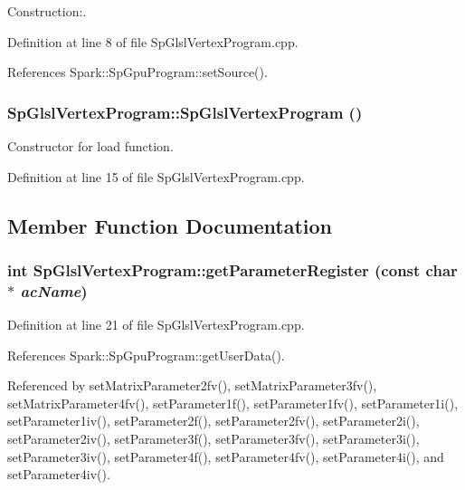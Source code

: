 Construction:. 

Definition at line 8 of file Sp\-Glsl\-Vertex\-Program.cpp.

References Spark::Sp\-Gpu\-Program::set\-Source().
\subsubsection{\setlength{\rightskip}{0pt plus 5cm}Sp\-Glsl\-Vertex\-Program::Sp\-Glsl\-Vertex\-Program ()\hspace{0.3cm}{\tt  [protected]}}\label{classSpark_1_1SpGlslVertexProgram_b0}


Constructor for load function. 

Definition at line 15 of file Sp\-Glsl\-Vertex\-Program.cpp.

\subsection{Member Function Documentation}
\subsubsection{\setlength{\rightskip}{0pt plus 5cm}int Sp\-Glsl\-Vertex\-Program::get\-Parameter\-Register (const char $\ast$ {\em ac\-Name})\hspace{0.3cm}{\tt  [protected]}}\label{classSpark_1_1SpGlslVertexProgram_b1}


Definition at line 21 of file Sp\-Glsl\-Vertex\-Program.cpp.

References Spark::Sp\-Gpu\-Program::get\-User\-Data().

Referenced by set\-Matrix\-Parameter2fv(), set\-Matrix\-Parameter3fv(), set\-Matrix\-Parameter4fv(), set\-Parameter1f(), set\-Parameter1fv(), set\-Parameter1i(), set\-Parameter1iv(), set\-Parameter2f(), set\-Parameter2fv(), set\-Parameter2i(), set\-Parameter2iv(), set\-Parameter3f(), set\-Parameter3fv(), set\-Parameter3i(), set\-Parameter3iv(), set\-Parameter4f(), set\-Parameter4fv(), set\-Parameter4i(), and set\-Parameter4iv().

